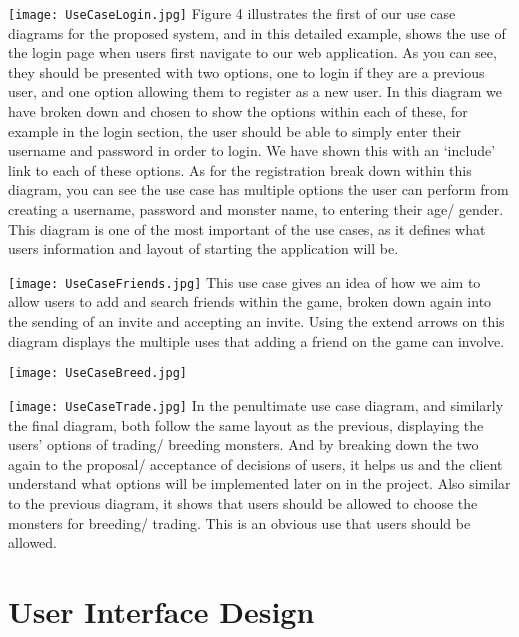 \documentclass[a4paper]{article}
\begin{document}
\begin{center}
\texttt{[image: UseCaseLogin.jpg]}
Figure 4 illustrates the first of our use case diagrams for the proposed system, and in this detailed example, shows the use of the login page when users first navigate to our web application. As you can see, they should be presented with two options, one to login if they are a previous user, and one option allowing them to register as a new user. In this diagram we have broken down and chosen to show the options within each of these, for example in the login section, the user should be able to simply enter their username and password in order to login. We have shown this with an ‘include’ link to each of these options. As for the registration break down within this diagram, you can see the use case has multiple options the user can perform from creating a username, password and monster name, to entering their age/ gender. This diagram is one of the most important of the use cases, as it defines what users information and layout of starting the application will be.

\texttt{[image: UseCaseFriends.jpg]}
This use case gives an idea of how we aim to allow users to add and search friends within the game, broken down again into the sending of an invite and accepting an invite. Using the extend arrows on this diagram displays the multiple uses that adding a friend on the game can involve.

\texttt{[image: UseCaseBreed.jpg]}

\texttt{[image: UseCaseTrade.jpg]}
In the penultimate use case diagram, and similarly the final diagram, both follow the same layout as the previous, displaying the users’ options of trading/ breeding monsters. And by breaking down the two again to the proposal/ acceptance of decisions of users, it helps us and the client understand what options will be implemented later on in the project. Also similar to the previous diagram, it shows that users should be allowed to choose the monsters for breeding/ trading. This is an obvious use that users should be allowed.
\end{center}
\clearpage


\section{User Interface Design}
\end{document}
